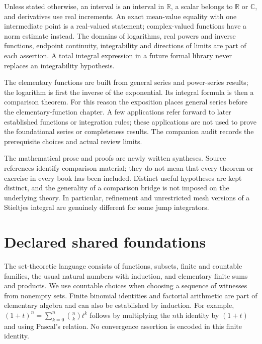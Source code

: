 \documentclass[11pt,oneside,a4paper]{book}
\theoremstyle{definition}
\theoremstyle{remark}
\newcommand{\R}{\mathbb R}
\newcommand{\C}{\mathbb C}
\begin{document}
Unless stated otherwise, an interval is an interval in $\R$, a scalar belongs to
$\R$ or $\C$, and derivatives use real increments. An exact mean-value equality
with one intermediate point is a real-valued statement; complex-valued functions
have a norm estimate instead. The domains of logarithms, real powers and inverse
functions, endpoint continuity, integrability and directions of limits are part
of each assertion. A total integral expression in a future formal library never
replaces an integrability hypothesis.

The elementary functions are built from general series and power-series results;
the logarithm is first the inverse of the exponential. Its integral formula is
then a comparison theorem. For this reason the exposition places general series
before the elementary-function chapter. A few applications refer forward to
later established functions or integration rules; these applications are not
used to prove the foundational series or completeness results. The companion
audit records the prerequisite choices and actual review limits.

The mathematical prose and proofs are newly written syntheses. Source references
identify comparison material; they do not mean that every theorem or exercise in
every book has been included. Distinct useful hypotheses are kept distinct, and
the generality of a comparison bridge is not imposed on the underlying theory.
In particular, refinement and unrestricted mesh versions of a Stieltjes integral
are genuinely different for some jump integrators.
\tableofcontents
\mainmatter

\chapter*{Declared shared foundations}
\label{shared-foundations}
The set-theoretic language consists of functions, subsets, finite and countable
families, the usual natural numbers with induction, and elementary finite sums
and products. We use countable choices when choosing a sequence of witnesses
from nonempty sets. Finite binomial identities and factorial arithmetic are part
of elementary algebra and can also be established by induction. For example,
$(1+t)^n=\sum_{k=0}^n\binom nk t^k$ follows by multiplying the $n$th identity by
$(1+t)$ and using Pascal's relation. No convergence assertion is encoded in this
finite identity.
\end{document}
